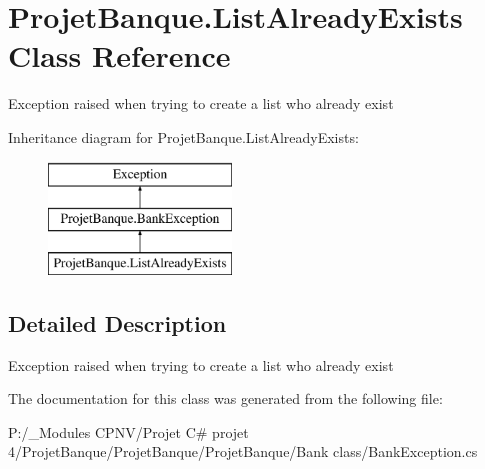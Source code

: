 \hypertarget{class_projet_banque_1_1_list_already_exists}{}\section{Projet\+Banque.\+List\+Already\+Exists Class Reference}
\label{class_projet_banque_1_1_list_already_exists}


Exception raised when trying to create a list who already exist  


Inheritance diagram for Projet\+Banque.\+List\+Already\+Exists\+:\begin{figure}[H]
\begin{center}
\leavevmode
\includegraphics[height=3.000000cm]{class_projet_banque_1_1_list_already_exists}
\end{center}
\end{figure}


\subsection{Detailed Description}
Exception raised when trying to create a list who already exist 



The documentation for this class was generated from the following file\+:\begin{DoxyCompactItemize}
\item 
P\+:/\+\_\+\+Modules C\+P\+N\+V/\+Projet C\# projet 4/\+Projet\+Banque/\+Projet\+Banque/\+Projet\+Banque/\+Bank class/Bank\+Exception.\+cs\end{DoxyCompactItemize}
